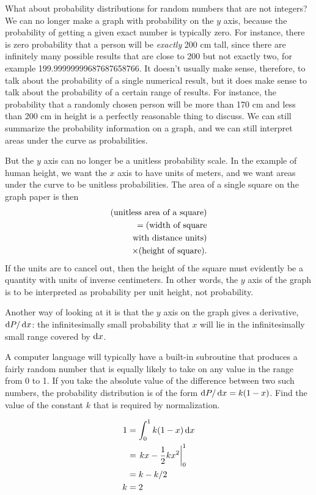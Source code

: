 What about probability distributions for random numbers that
are not integers? We can no longer make a graph with
probability on the $y$ axis, because the probability of
getting a given exact number is typically zero. For
instance, there is zero probability that a person will be
\emph{exactly} 200 cm tall, since there are
infinitely many possible results that are close to 200 but not
exactly two, for example 199.99999999687687658766.
It doesn't usually make sense, therefore, to talk
about the probability of a single numerical result, but it
does make sense to talk about the probability of a certain
range of results. For instance, the probability that a randomly
chosen person will be more than 170 cm and less than 200 cm
in height is a perfectly
reasonable thing to discuss. We can still summarize the
probability information on a graph, and we can still
interpret areas under the curve as probabilities.
%

But the $y$ axis can no longer be a unitless probability
scale. In the example of human height, we want the $x$
axis to have units of meters, and we want areas under the
curve to be unitless probabilities. The area of a single
square on the graph paper is then
\begin{align*}
 (\text{unitless area of a square})\\
         =  (\text{width of square}\\
             \text{with distance units}) \\
             \times (\text{height of square}).
\end{align*}
If the units are to cancel out, then the height of the
square must evidently be a quantity with units of inverse
centimeters. In other words, the $y$ axis of the graph is to be
interpreted as probability per unit height, not probability.

Another way of looking at it is that the $y$ axis on the graph
gives a derivative, $\operatorname{d\!} P/\operatorname{d\!} x$: the infinitesimally small
probability that $x$ will lie in the infinitesimally small
range covered by $\operatorname{d\!} x$.

\begin{eg}\label{eg:random-diff}
\egquestion A computer language will typically have a built-in
subroutine that produces a fairly random number that is equally
likely to take on any value in the range from 0 to 1. If you
take the absolute value of the difference between two such
numbers, the probability distribution is of the form
$\operatorname{d\!} P/\operatorname{d\!} x=k(1-x)$. Find the value of the constant $k$
that is required by normalization.

\eganswer
\begin{align*}
  1 &= \int_0^1 k(1-x)\operatorname{d\!} x \\
    &= \left.kx-\frac{1}{2}kx^2\right|_0^1 \\
    &= k-k/2 \\
  k &= 2
\end{align*}
\end{eg}

